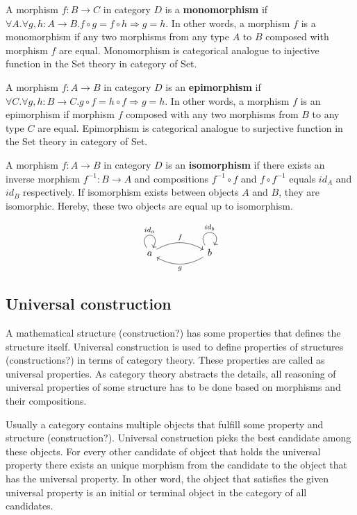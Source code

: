 \documentclass[article]{aaltoseries}
\begin{document}
    A morphism $f: B \rightarrow C$ in category $D$ is a \textbf{monomorphism} if $\forall A. \forall g, h: A \rightarrow B.
    f \circ g = f \circ h \Rightarrow g = h$. In other words, a morphism $f$ is a monomorphism if
    any two morphisms from any type $A$ to $B$ composed with morphism $f$ are equal.
    Monomorphism is categorical analogue to injective function in the Set theory
    in category of Set.

    A morphism $f: A \rightarrow B$ in category $D$ is an \textbf{epimorphism} if $\forall C. \forall g, h: B \rightarrow C.
    g \circ f = h \circ f \Rightarrow g = h$. In other words, a morphism $f$ is an epimorphism if
    morphism $f$ composed with any two morphisms from $B$ to any type $C$ are equal.
    Epimorphism is categorical analogue to surjective function in the Set theory
    in category of Set.

    A morphism $f: A \rightarrow B$ in category $D$ is an \textbf{isomorphism} if there exists an
    inverse morphism $f^{-1}: B \rightarrow A$ and compositions $f^{-1} \circ f$ and $f \circ f^{-1}$ equals $id_A$
    and $id_B$ respectively. If isomorphism exists between objects $A$ and $B$, they
    are isomorphic. Hereby, these two objects are equal up to isomorphism.

    \[
      \begin{tikzcd}[row sep=huge, column sep=huge]
        a \arrow[r, bend left, "f"]
        \arrow[loop above, distance=2em, in=60, out=120, "id_a"]
        & b \arrow[l, bend left, "g"]
        \arrow[loop above, distance=2em, in=60, out=120, "id_b"]
      \end{tikzcd}
    \]


  \subsection{Universal construction} 
    A mathematical structure (construction?) has some properties that defines the
    structure itself. Universal construction is used to define properties of
    structures (constructions?) in terms of category theory. These properties are
    called as universal properties. As category theory abstracts the details, all
    reasoning of universal properties of some structure has to be done based on
    morphisms and their compositions.
 
    Usually a category contains multiple objects that fulfill some property and
    structure (construction?). Universal construction picks the best candidate among
    these objects. For every other candidate of object that holds the universal
    property there exists an unique morphism from the candidate to the object that
    has the universal property. In other word, the object that satisfies the given
    universal property is an initial or terminal object in the category of all
    candidates.
  
\end{document}
